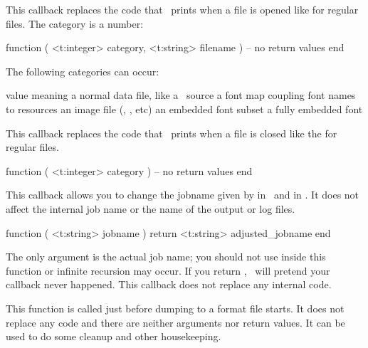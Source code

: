 \stopsubsection

\startsubsection[title=start_file]

This callback replaces the code that \LUAMETATEX\ prints when a file is opened like
 for regular files. The category is a number:

\starttyping[option=LUA]
function (
    <t:integer> category,
    <t:string>  filename
)
    -- no return values
end
\stoptyping

The following categories can occur:

\starttabulate[|c|l|]
\FL
\BC value  \BC meaning \NC \NR
\ML
{} \NC a normal data file, like a \TEX\ source \NC \NR
{} \NC a font map coupling font names to resources \NC \NR
{} \NC an image file (, , etc) \NC \NR
{} \NC an embedded font subset \NC \NR
{} \NC a fully embedded font \NC \NR
\LL
\stoptabulate

\stopsubsection

\startsubsection[title=stop_file]

This callback replaces the code that \LUAMETATEX\ prints when a file is closed like
the \type {)} for regular files.

\starttyping[option=LUA]
function (
    <t:integer> category
)
    -- no return values
end
\stoptyping

\stopsubsection

\stopsection

\startsection[title=Running]

\startsubsection[title=process_jobname]

This callback allows you to change the jobname given by \type {\jobname} in \TEX\
and  in \LUA. It does not affect the internal job name or the
name of the output or log files.

\starttyping[option=LUA]
function (
    <t:string> jobname
)
    return <t:string> adjusted_jobname
end
\stoptyping

The only argument is the actual job name; you should not use 
inside this function or infinite recursion may occur. If you return \type {nil},
\LUAMETATEX\ will pretend your callback never happened. This callback does not
replace any internal code.

\stopsubsection

\startsubsection[title=pre_dump]

This function is called just before dumping to a format file starts. It does not
replace any code and there are neither arguments nor return values. It can be
used to do some cleanup and other housekeeping.

